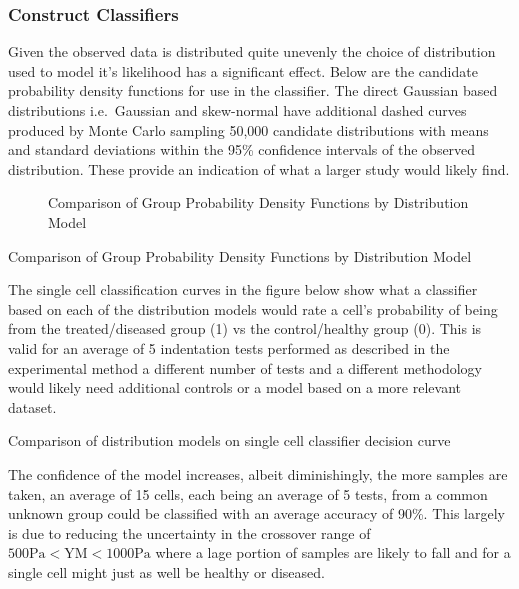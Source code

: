 \documentclass[
  paper=a4,
  ,captions=tableheading
]{scrartcl}
\makeatletter
\newcommand*\pandocbounded[1]{%
  \sbox\pandoc@box{#1}%
  \Gscale@div\@tempa{\textheight}{\dimexpr\ht\pandoc@box+\dp\pandoc@box\relax}%
  \Gscale@div\@tempb{\linewidth}{\wd\pandoc@box}%
  \ifdim\@tempb\p@<\@tempa\p@\let\@tempa\@tempb\fi%
  \ifdim\@tempa\p@<\p@\scalebox{\@tempa}{\usebox\pandoc@box}%
  \else\usebox{\pandoc@box}%
  \fi%
}
\renewenvironment{quote}{\begin{customblockquote}\list{}{\rightmargin=0em\leftmargin=0em}%
\item\relax\color{blockquote-text}\ignorespaces}{\unskip\unskip\endlist\end{customblockquote}}
\makeatother
\begin{document}
\subsubsection{Construct Classifiers}\label{construct-classifiers}

Given the observed data is distributed quite unevenly the choice of
distribution used to model it's likelihood has a significant effect.
Below are the candidate probability density functions for use in the
classifier. The direct Gaussian based distributions i.e.~Gaussian and
skew-normal have additional dashed curves produced by Monte Carlo
sampling 50,000 candidate distributions with means and standard
deviations within the 95\% confidence intervals of the observed
distribution. These provide an indication of what a larger study would
likely find.

\begin{figure}
\centering
\pandocbounded{}
\caption{Comparison of Group Probability Density Functions by
Distribution Model}
\end{figure}

\begin{quote}
Comparison of Group Probability Density Functions by Distribution Model
\end{quote}

The single cell classification curves in the figure below show what a
classifier based on each of the distribution models would rate a cell's
probability of being from the treated/diseased group (1) vs the
control/healthy group (0). This is valid for an average of 5 indentation
tests performed as described in the experimental method a different
number of tests and a different methodology would likely need additional
controls or a model based on a more relevant dataset.

\begin{quote}
\pandocbounded{}
Comparison of distribution models on single cell classifier decision
curve
\end{quote}

The confidence of the model increases, albeit diminishingly, the more
samples are taken, an average of 15 cells, each being an average of 5
tests, from a common unknown group could be classified with an average
accuracy of 90\%. This largely is due to reducing the uncertainty in the
crossover range of \(500 \text{Pa} \lt  \text{YM} \lt 1000 \text{Pa}\)
where a lage portion of samples are likely to fall and for a single cell
might just as well be healthy or diseased.
\end{document}

